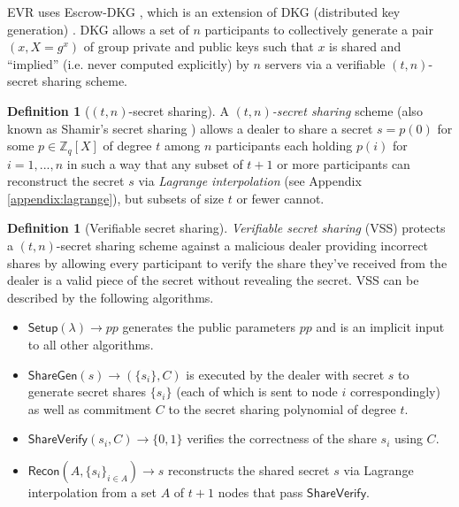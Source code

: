 \documentclass[letterpaper,twocolumn,10pt]{article}
\theoremstyle{definition}
\newtheorem{definition}[theorem]{Definition}
\theoremstyle{remark}
\begin{document}
EVR uses Escrow-DKG \cite{david2019rational}, which is an extension of DKG (distributed key generation) \cite{pedersen1991threshold,gennaro1999secure,gennaro3revisiting}. DKG allows a set of $n$ participants to collectively generate a pair $(x, X = g^x)$ of group private and public keys such that $x$ is shared and ``implied'' (i.e. never computed explicitly) by $n$ servers via a verifiable $(t, n)$-secret sharing scheme.

\begin{definition}[$(t, n)$-secret sharing]
A \textit{$(t, n)$-secret sharing} scheme (also known as Shamir's secret sharing \cite{shamir1979share}) allows a dealer to share a secret $s = p(0)$ for some $p \in \mathbb{Z}_q[X]$ of degree $t$ among $n$ participants each holding $p(i)$ for $i = 1, ..., n$ in such a way that any subset of $t + 1$ or more participants can reconstruct the secret $s$ via \textit{Lagrange interpolation} (see Appendix \ref{appendix:lagrange}), but subsets of size $t$ or fewer cannot.
\end{definition}

\begin{definition}[Verifiable secret sharing]
\textit{Verifiable secret sharing} (VSS) \cite{feldman1987practical, pedersen1991non} protects a $(t, n)$-secret sharing scheme against a malicious dealer providing incorrect shares by allowing every participant to verify the share they've received from the dealer is a valid piece of the secret without revealing the secret. VSS can be described by the following algorithms.
\begin{itemize}
    \item $\mathsf{Setup}(\lambda) \rightarrow pp$ generates the public parameters $pp$ and is an implicit input to all other algorithms.
    \item $\mathsf{ShareGen}(s) \rightarrow (\{s_i\}, C)$ is executed by the dealer with secret $s$ to generate secret shares $\{s_i\}$ (each of which is sent to node $i$ correspondingly) as well as commitment $C$ to the secret sharing polynomial of degree $t$.
    \item $\mathsf{ShareVerify}(s_i, C) \rightarrow \{0, 1\}$ verifies the correctness of the share $s_i$ using $C$.
    \item $\mathsf{Recon}(A, \{s_i\}_{i \in A}) \rightarrow s$ reconstructs the shared secret $s$ via Lagrange interpolation from a set $A$ of $t + 1$ nodes that pass $\mathsf{ShareVerify}$.
\end{itemize}
\end{definition}
\end{document}
